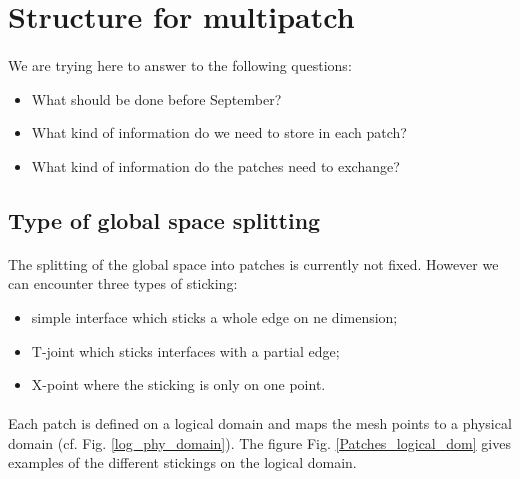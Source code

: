 \documentclass[presentation.tex]{subfiles}
\begin{document}
\maketitle


\section{Structure for multipatch}
\paragraph{}
We are trying here to answer to the following questions: 
\begin{itemize}
	\item What should be done before September? %
	\item What kind of information do we need to store in each patch? 
	\item What kind of information do the patches need to exchange? 
\end{itemize}


\subsection{Type of global space splitting}
\paragraph{}
The splitting of the global space into patches is currently not fixed. However we can encounter three types of sticking: 
\begin{itemize}
	\item simple interface which sticks a whole edge on ne dimension; 
	\item T-joint which sticks interfaces with a partial edge; 
	\item X-point where the sticking is only on one point. 
\end{itemize}

\paragraph{}
Each patch is defined on a logical domain and maps the mesh points to a physical domain (cf. Fig. \ref{log_phy_domain}). 
The figure Fig. \ref{Patches_logical_dom} gives examples of the different stickings on the logical domain. 
\end{document}
